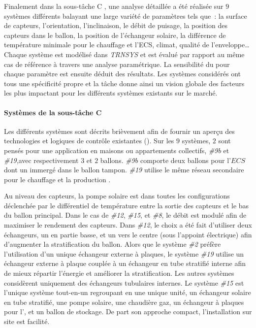Finalement dans la sous-tâche C \parencite{Task26C2007}, une analyse détaillée a été réalisée sur
$9$ systèmes différents balayant une large variété de
paramètres tels que~: la surface de capteurs, l’orientation, l’inclinaison, le débit de puisage,
la position des capteurs dans le ballon, la position de l’échangeur solaire, la différence de
température minimale pour le chauffage et l’ECS, climat, qualité de l’enveloppe\dots
Chaque système est modélisé dans \textit{TRNSYS} et est évalué par
rapport au même cas de référence à travers une analyse paramétrique. La sensibilité du
 pour chaque paramètre est ensuite déduit des résultats. Les systèmes
considérés ont tous une spécificité propre et la tâche donne ainsi un vision globale des
facteurs les plus impactant pour les différents systèmes existants sur le marché.

\paragraph{Systèmes de la sous-tâche C} %
\label{par:systemes_de_la_sous_tache_c}
Les différents systèmes sont décrits brièvement afin de fournir un aperçu des
technologies et logiques de contrôle existantes ().
Sur les $9$ systèmes, $2$ sont pensés pour une application en maisons ou appartements
collectifs, \emph{\#9b} et \emph{\#19},avec respectivement $3$ et $2$ ballons.
\emph{\#9b} comporte deux ballons pour l’$ECS$ dont un immergé
dans le ballon tampon. \emph{\#19} utilise le même réseau secondaire pour le chauffage
et la production .

Au niveau des capteurs, la pompe solaire est dans toutes les configurations déclenchée par
le différentiel de température entre la sortie des capteurs et le bas du ballon principal.
Dans le cas de \emph{\#12}, \emph{\#15}, et \emph{\#8}, le débit est modulé afin de
maximiser le rendement des capteurs. Dans \emph{\#12}, le choix a été fait d’utiliser deux
échangeurs, un en partie basse, et un vers le centre (sous l’appoint électrique) afin
d’augmenter la stratification du ballon. Alors que le système \emph{\#2} préfère
l’utilisation d’un unique échangeur externe à plaques, le système \emph{\#19} utilise un
échangeur externe à plaque couplée à un échangeur en tube stratifié interne afin de mieux
répartir l’énergie et améliorer la stratification. Les autres systèmes considèrent
uniquement des échangeurs tubulaires internes.
Le système \emph{\#15} est l’unique système tout-en-un regroupant en une unique unité,
un échangeur solaire en tube stratifié, une pompe solaire,
une chaudière gaz, un échangeur à plaques pour l’, et un ballon de stockage.
De part son approche compact, l’installation sur site est facilité.

